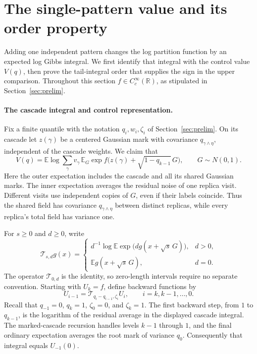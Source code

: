 \documentclass[11pt]{article}
\newcommand{\R}{\mathbb R}
\newcommand{\E}{\mathbb E}
\begin{document}
\section{The single-pattern value and its order property}\label{sec:value}

Adding one independent pattern changes the log partition function by an expected log Gibbs integral. We first identify that integral with the control value $V(q)$, then prove the tail-integral order that supplies the sign in the upper comparison. Throughout this section $f\in C_c^\infty(\R)$, as stipulated in Section~\ref{sec:prelim}.

\paragraph{The cascade integral and control representation.}
Fix a finite quantile with the notation $q_i,w_i,\zeta_i$ of Section~\ref{sec:prelim}. On its cascade let $z(\gamma)$ be a centered Gaussian mark with covariance $q_{\gamma\wedge\eta}$, independent of the cascade weights. We claim that
\begin{equation*}
 V(q)=\E\log\sum_\gamma v_\gamma\,
       \E_G\exp f\bigl(z(\gamma)+\sqrt{1-q_{k-1}}\,G\bigr),
 \qquad G\sim N(0,1).
\end{equation*}
Here the outer expectation includes the cascade and all its shared Gaussian marks. The inner expectation averages the residual noise of one replica visit. Different visits use independent copies of $G$, even if their labels coincide. Thus the shared field has covariance $q_{\gamma\wedge\eta}$ between distinct replicas, while every replica's total field has variance one.

For $s\ge0$ and $d\ge0$, write
\[
 \mathcal T_{s,d}g(x)=
 \begin{cases}
 d^{-1}\log\E\exp\bigl(dg(x+\sqrt{s}\,G)\bigr),&d>0,\\
 \E g(x+\sqrt{s}\,G),&d=0.
 \end{cases}
\]
The operator $\mathcal T_{0,d}$ is the identity, so zero-length intervals require no separate convention. Starting with $U_k=f$, define backward functions by
\[
 U_{i-1}=\mathcal T_{q_i-q_{i-1},\zeta_i}U_i,
 \qquad i=k,k-1,\ldots,0.
\]
Recall that $q_{-1}=0$, $q_k=1$, $\zeta_0=0$, and $\zeta_k=1$. The first backward step, from $1$ to $q_{k-1}$, is the logarithm of the residual average in the displayed cascade integral. The marked-cascade recursion handles levels $k-1$ through $1$, and the final ordinary expectation averages the root mark of variance $q_0$. Consequently that integral equals $U_{-1}(0)$.
\end{document}
